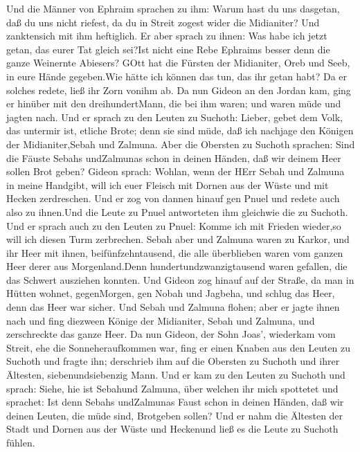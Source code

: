  Und die Männer von Ephraim sprachen zu ihm: Warum hast du
uns dasgetan, daß du uns nicht riefest, da du in Streit zogest wider die
Midianiter? Und zanktensich mit ihm heftiglich.  Er aber
sprach zu ihnen: Was habe ich jetzt getan, das eurer Tat gleich sei?Ist
nicht eine Rebe Ephraims besser denn die ganze Weinernte Abiesers?
 GOtt hat die Fürsten der Midianiter, Oreb und Seeb, in eure
Hände gegeben.Wie hätte ich können das tun, das ihr getan habt? Da er
solches redete, ließ ihr Zorn vonihm ab.  Da nun Gideon an
den Jordan kam, ging er hinüber mit den dreihundertMann, die bei ihm
waren; und waren müde und jagten nach.  Und er sprach zu den
Leuten zu Suchoth: Lieber, gebet dem Volk, das untermir ist, etliche
Brote; denn sie sind müde, daß ich nachjage den Königen der
Midianiter,Sebah und Zalmuna.  Aber die Obersten zu Suchoth
sprachen: Sind die Fäuste Sebahs undZalmunas schon in deinen Händen, daß
wir deinem Heer sollen Brot geben?  Gideon sprach: Wohlan,
wenn der HErr Sebah und Zalmuna in meine Handgibt, will ich euer Fleisch
mit Dornen aus der Wüste und mit Hecken zerdreschen.  Und er
zog von dannen hinauf gen Pnuel und redete auch also zu ihnen.Und die
Leute zu Pnuel antworteten ihm gleichwie die zu Suchoth. 
Und er sprach auch zu den Leuten zu Pnuel: Komme ich mit Frieden
wieder,so will ich diesen Turm zerbrechen.  Sebah aber und
Zalmuna waren zu Karkor, und ihr Heer mit ihnen, beifünfzehntausend, die
alle überblieben waren vom ganzen Heer derer aus Morgenland.Denn
hundertundzwanzigtausend waren gefallen, die das Schwert ausziehen
konnten.  Und Gideon zog hinauf auf der Straße, da man in
Hütten wohnet, gegenMorgen, gen Nobah und Jagbeha, und schlug das Heer,
denn das Heer war sicher.  Und Sebah und Zalmuna flohen;
aber er jagte ihnen nach und fing diezween Könige der Midianiter, Sebah
und Zalmuna, und zerschreckte das ganze Heer.  Da nun
Gideon, der Sohn Joas', wiederkam vom Streit, ehe die Sonneheraufkommen
war,  fing er einen Knaben aus den Leuten zu Suchoth und
fragte ihn; derschrieb ihm auf die Obersten zu Suchoth und ihrer
Ältesten, siebenundsiebenzig Mann.  Und er kam zu den
Leuten zu Suchoth und sprach: Siehe, hie ist Sebahund Zalmuna, über
welchen ihr mich spottetet und sprachet: Ist denn Sebahs undZalmunas
Faust schon in deinen Händen, daß wir deinen Leuten, die müde sind,
Brotgeben sollen?  Und er nahm die Ältesten der Stadt und
Dornen aus der Wüste und Heckenund ließ es die Leute zu Suchoth fühlen.

